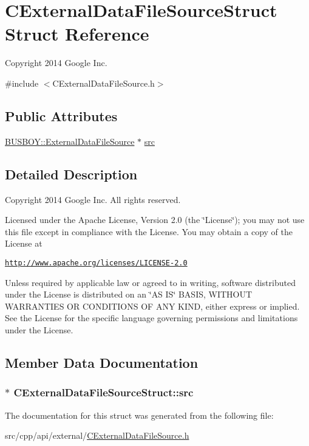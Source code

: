 \hypertarget{structCExternalDataFileSourceStruct}{
\section{CExternalDataFileSourceStruct Struct Reference}
\label{structCExternalDataFileSourceStruct}
}


Copyright 2014 Google Inc.  


{\ttfamily \#include $<$CExternalDataFileSource.h$>$}\subsection*{Public Attributes}
\begin{DoxyCompactItemize}
\item 
\hyperlink{classBUSBOY_1_1ExternalDataFileSource}{BUSBOY::ExternalDataFileSource} $\ast$ \hyperlink{structCExternalDataFileSourceStruct_a22c0dc07bbc882880808e70bba8096ec}{src}
\end{DoxyCompactItemize}


\subsection{Detailed Description}
Copyright 2014 Google Inc. All rights reserved.

Licensed under the Apache License, Version 2.0 (the \char`\"{}License\char`\"{}); you may not use this file except in compliance with the License. You may obtain a copy of the License at

\href{http://www.apache.org/licenses/LICENSE-2.0}{\tt http://www.apache.org/licenses/LICENSE-\/2.0}

Unless required by applicable law or agreed to in writing, software distributed under the License is distributed on an \char`\"{}AS IS\char`\"{} BASIS, WITHOUT WARRANTIES OR CONDITIONS OF ANY KIND, either express or implied. See the License for the specific language governing permissions and limitations under the License. 

\subsection{Member Data Documentation}
\hypertarget{structCExternalDataFileSourceStruct_a22c0dc07bbc882880808e70bba8096ec}{
\subsubsection[{src}]{$\ast$ {\bf CExternalDataFileSourceStruct::src}}}
\label{structCExternalDataFileSourceStruct_a22c0dc07bbc882880808e70bba8096ec}


The documentation for this struct was generated from the following file:\begin{DoxyCompactItemize}
\item 
src/cpp/api/external/\hyperlink{CExternalDataFileSource_8h}{CExternalDataFileSource.h}\end{DoxyCompactItemize}
